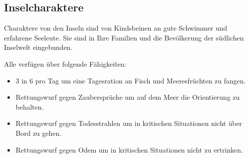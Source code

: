 \documentclass[11pt]{wbzine}
\begin{document}
\begin{multicols}{2}
\subsection{Inselcharaktere}

Charaktere von den Inseln sind von Kindsbeinen an gute Schwimmer
und erfahrene Seeleute. Sie sind in Ihre Familien und die
Bevölkerung der südlichen Inselwelt eingebunden.

Alle verfügen über folgende Fähigkeiten:

\begin{itemize}
    \item 3 in 6 pro Tag um eine Tagesration an Fisch und Meeresfrüchten zu
fangen.

\item Rettungswurf gegen Zaubersprüche um auf dem Meer die Orientierung
zu behalten.

\item Rettungswurf gegen Todesstrahlen um in kritischen Situationen
nicht über Bord zu gehen.

\item Rettungswurf gegen Odem um in kritischen Situationen nicht zu
ertrinken.
\end{itemize}


\end{multicols}
\end{document}
